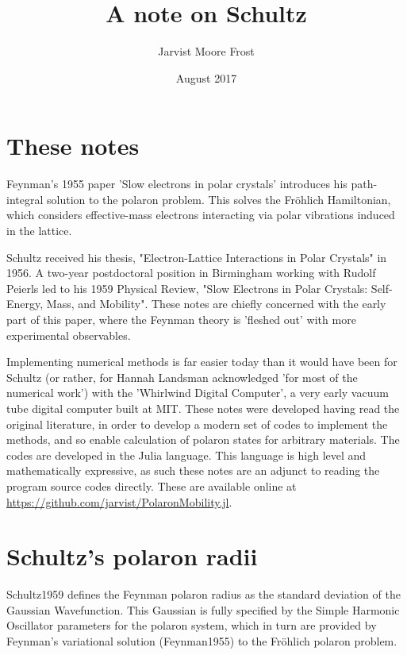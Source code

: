 \documentclass[twocolumn,11pt]{article}
\title{A note on Schultz}
\author{Jarvist Moore Frost}
\date{August 2017}
\begin{document}
\maketitle

\section{These notes}

Feynman's 1955 paper 'Slow electrons in polar crystals'\cite{Feynman1955}
introduces his path-integral solution to the polaron problem. 
This solves the Fr\"ohlich Hamiltonian, which considers effective-mass
electrons interacting via polar vibrations induced in the lattice. 

Schultz\cite{Fowler2005} received his thesis, "Electron-Lattice Interactions in
Polar Crystals" in 1956. 
A two-year postdoctoral position in Birmingham working with Rudolf Peierls led
to his 1959 Physical Review, 
"Slow Electrons in Polar Crystals: Self-Energy, Mass, and
Mobility"\cite{Schultz1959}.  
These notes are chiefly concerned with the early part of this paper, where the
Feynman theory is 'fleshed out' with more experimental observables. 

Implementing numerical methods is far easier today than it would have been for
Schultz (or rather, for Hannah Landsman acknowledged 'for most of the numerical
work') with the 'Whirlwind Digital Computer'\cite{WhirlwindWikipedia}, a very early
vacuum tube digital computer built at MIT.  
These notes were developed having read the original literature, in order to
develop a modern set of codes to implement the methods, and so enable
calculation of polaron states for arbitrary materials. 
The codes are developed in the Julia language\cite{Julia}. 
This language is high level and mathematically expressive, as such these notes
are an adjunct to reading the program source codes directly.  
These are available online at
\url{https://github.com/jarvist/PolaronMobility.jl}.

\section{Schultz's polaron radii}

Schultz1959\cite{Schultz1959}  defines the
Feynman polaron radius as the standard deviation of the Gaussian Wavefunction. 
This Gaussian is fully specified by the Simple Harmonic Oscillator parameters
for the polaron system, which in turn are provided by Feynman's variational
solution (Feynman1955\cite{Feynman1955}) to the
Fr\"ohlich polaron problem.
\end{document}
